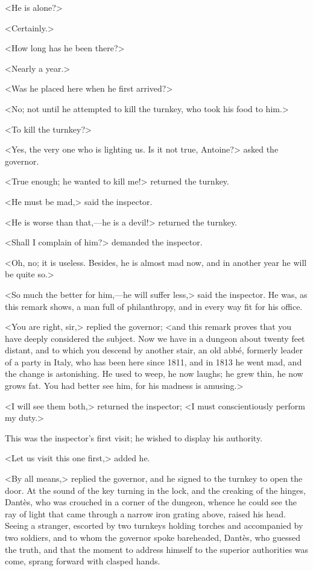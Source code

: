  <He is alone?> 

 <Certainly.> 

 <How long has he been there?> 

 <Nearly a year.> 

 <Was he placed here when he first arrived?> 

 <No; not until he attempted to kill the turnkey, who took his food to him.> 

 <To kill the turnkey?> 

 <Yes, the very one who is lighting us. Is it not true, Antoine?> asked the governor. 

 <True enough; he wanted to kill me!> returned the turnkey. 

 <He must be mad,> said the inspector. 

 <He is worse than that,—he is a devil!> returned the turnkey. 

 <Shall I complain of him?> demanded the inspector. 

 <Oh, no; it is useless. Besides, he is almost mad now, and in another year he will be quite so.> 

 <So much the better for him,—he will suffer less,> said the inspector. He was, as this remark shows, a man full of philanthropy, and in every way fit for his office. 

 <You are right, sir,> replied the governor; <and this remark proves that you have deeply considered the subject. Now we have in a dungeon about twenty feet distant, and to which you descend by another stair, an old abbé, formerly leader of a party in Italy, who has been here since 1811, and in 1813 he went mad, and the change is astonishing. He used to weep, he now laughs; he grew thin, he now grows fat. You had better see him, for his madness is amusing.> 

 <I will see them both,> returned the inspector; <I must conscientiously perform my duty.> 

 This was the inspector's first visit; he wished to display his authority. 

 <Let us visit this one first,> added he. 

 <By all means,> replied the governor, and he signed to the turnkey to open the door. At the sound of the key turning in the lock, and the creaking of the hinges, Dantès, who was crouched in a corner of the dungeon, whence he could see the ray of light that came through a narrow iron grating above, raised his head. Seeing a stranger, escorted by two turnkeys holding torches and accompanied by two soldiers, and to whom the governor spoke bareheaded, Dantès, who guessed the truth, and that the moment to address himself to the superior authorities was come, sprang forward with clasped hands. 

